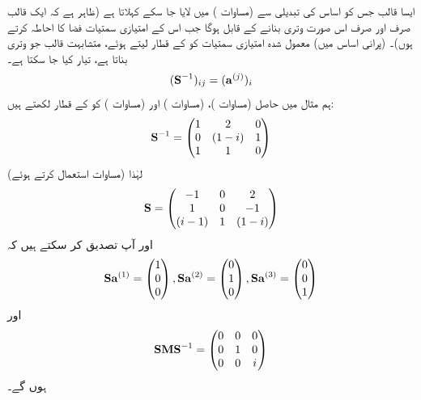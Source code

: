 ایسا قالب جس کو اساس کی تبدیلی سے    (مساوات )   میں لایا جا سکے     کہلاتا ہے (ظاہر ہے کہ  ایک قالب  صرف اور صرف  اس صورت   وتری بنانے کے قابل  ہوگا جب اس کے امتیازی سمتیات فضا کا احاطہ کرتے ہوں)۔   (پرانی اساس میں)  معمول شدہ امتیازی سمتیات  کو  کے قطار لیتے ہوئے،   متشابہت قالب جو وتری بناتا  ہے،  تیار کیا جا سکتا ہے۔
\begin{align}
	(\operatorname{\mathbf{S}}^{-1})_{ij} = (\operatorname{\mathbf{a}}^{(j)})_i
\end{align}
ہم  مثال   میں حاصل   (مساوات )،   (مساوات ) اور   (مساوات ) کو  کے قطار لکھتے ہیں:
\begin{align*}
	\operatorname{\mathbf{S}}^{-1} =
	\begin{pmatrix}
		1 & 2 & 0\\
		0 & (1-i) & 1\\
		1 & 1 & 0
	\end{pmatrix}
\end{align*}
لہٰذا     (مساوات   استعمال کرتے ہوئے)
\begin{align*}
	\operatorname{\mathbf{S}}=
	\begin{pmatrix}
		-1 & 0 & 2\\
		1 & 0 & -1\\
		(i-1) & 1 & (1-i)
	\end{pmatrix}
\end{align*}
اور آپ تصدیق کر سکتے ہیں کہ
\begin{align*}
	\operatorname{\mathbf{Sa}}^{(1)}=
	\begin{pmatrix}
		1\\0\\0
	\end{pmatrix}
	,
	\operatorname{\mathbf{Sa}}^{(2)}=
	\begin{pmatrix}
		0\\1\\0
	\end{pmatrix}
	,
	\operatorname{\mathbf{Sa}}^{(3)}=
	\begin{pmatrix}
		0\\0\\1
	\end{pmatrix}
\end{align*}
اور
\begin{align*}
	\operatorname{\mathbf{SMS}}^{-1}=
	\begin{pmatrix}
		0 & 0 & 0\\
		0 & 1 & 0\\
		0 & 0 & i
	\end{pmatrix}
\end{align*}
ہوں گے۔

